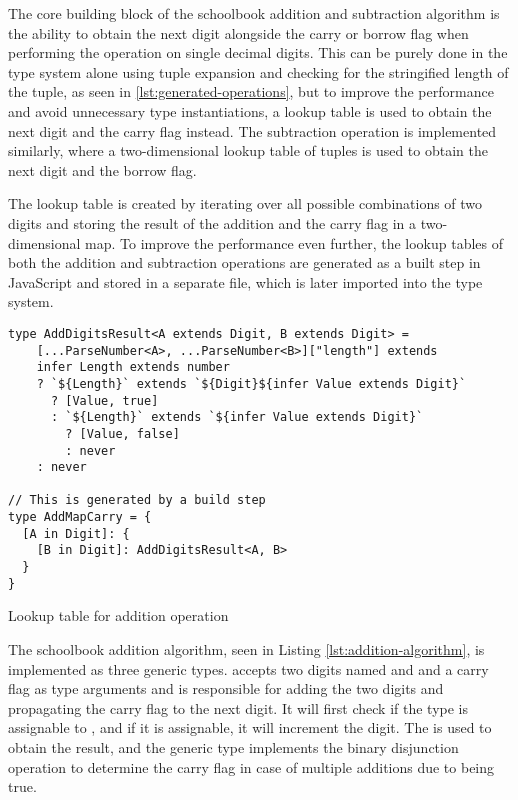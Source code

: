The core building block of the schoolbook addition and subtraction algorithm is the ability to obtain the next digit alongside the carry or borrow flag when performing the operation on single decimal digits. This can be purely done in the type system alone using tuple expansion and checking for the stringified length of the tuple, as seen in \ref{lst:generated-operations}, but to improve the performance and avoid unnecessary type instantiations, a lookup table is used to obtain the next digit and the carry flag instead. The subtraction operation is implemented similarly, where a two-dimensional lookup table of tuples is used to obtain the next digit and the borrow flag.

The lookup table is created by iterating over all possible combinations of two digits and storing the result of the addition and the carry flag in a two-dimensional map. To improve the performance even further, the lookup tables of both the addition and subtraction operations are generated as a built step in JavaScript and stored in a separate file, which is later imported into the type system.

\begin{listing}[ht]
  \begin{verbatim}
type AddDigitsResult<A extends Digit, B extends Digit> =
    [...ParseNumber<A>, ...ParseNumber<B>]["length"] extends 
    infer Length extends number
    ? `${Length}` extends `${Digit}${infer Value extends Digit}`
      ? [Value, true]
      : `${Length}` extends `${infer Value extends Digit}`
        ? [Value, false]
        : never
    : never

// This is generated by a build step
type AddMapCarry = {
  [A in Digit]: {
    [B in Digit]: AddDigitsResult<A, B>
  }
}
\end{verbatim}
  \caption{Lookup table for addition operation}\label{lst:generated-operations}
\end{listing}

The schoolbook addition algorithm, seen in Listing \ref{lst:addition-algorithm}, is implemented as three generic types.  accepts two digits named  and  and a carry flag as type arguments and is responsible for adding the two digits and propagating the carry flag to the next digit. It will first check if the  type is assignable to , and if it is assignable, it will increment the  digit. The  is used to obtain the result, and the  generic type implements the binary disjunction operation to determine the carry flag in case of multiple additions due to  being true.

